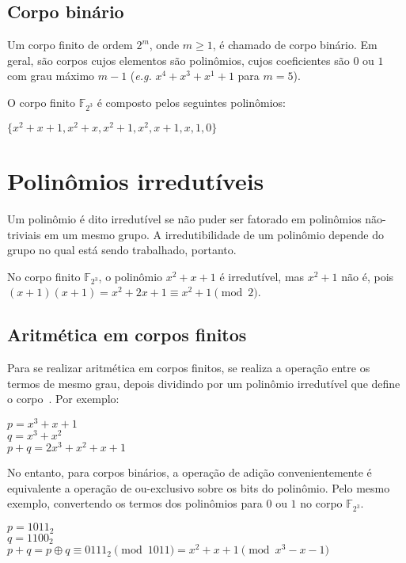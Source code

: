 \documentclass[12pt]{article}
\begin{document}
\subsection{Corpo binário}

Um corpo finito de ordem $2^{m}$, onde $m \geq 1$, é chamado de corpo binário.
Em geral, são corpos cujos elementos são polinômios, cujos coeficientes são $0$
ou $1$ com grau máximo $m-1$ (\textit{e.g.} $x^{4} + x^{3} + x^{1} + 1$ para
$m = 5$).

O corpo finito $\mathbb{F}_{2^{3}}$ é composto pelos seguintes polinômios:

\begin{center}
    $\{x^{2}+x+1, x^{2}+x, x^{2}+1, x^{2}, x+1, x, 1, 0\}$
\end{center}

\section{Polinômios irredutíveis}

Um polinômio é dito irredutível se não puder ser fatorado em polinômios
não-triviais em um mesmo grupo. A irredutibilidade de um polinômio depende do
grupo no qual está sendo trabalhado, portanto.

No corpo finito $\mathbb{F}_{2^{3}}$, o polinômio $x^{2}+x+1$ é irredutível,
mas $x^{2}+1$ não é, pois $(x+1)(x+1) = x^{2}+2x+1 \equiv x^{2}+1 \pmod{2}$.

\subsection{Aritmética em corpos finitos}

Para se realizar aritmética em corpos finitos, se realiza a operação entre os
termos de mesmo grau, depois dividindo por um polinômio irredutível que define
o corpo~\cite{stallings:2002}. Por exemplo:

\begin{center}
    $p = x^{3}+x+1$ \\
    $q = x^{3}+x^{2}$ \\
    $p+q = 2x^{3}+x^{2}+x+1$
\end{center}

No entanto, para corpos binários, a operação de adição convenientemente é
equivalente a operação de ou-exclusivo sobre os bits do polinômio. Pelo mesmo
exemplo, convertendo os termos dos polinômios para $0$ ou $1$ no corpo
$\mathbb{F}_{2^{3}}$.

\begin{center}
    $p = {1011}_2$ \\
    $q = {1100}_2$ \\
    $p+q = p \oplus q \equiv {0111}_2 \pmod{1011} = x^{2}+x+1 \pmod{x^{3}-x-1}$
\end{center}
\end{document}
